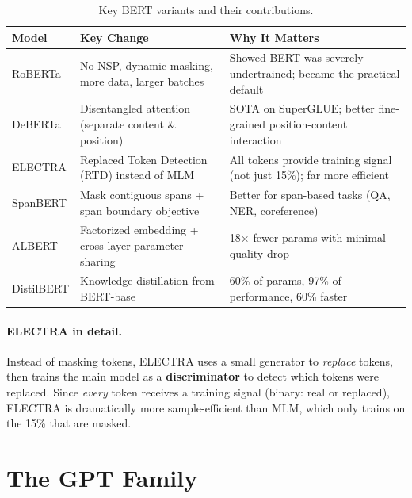 \begin{table}[H]
\centering
\small
\begin{tabularx}{\textwidth}{@{}l l X@{}}
\toprule
\textbf{Model} & \textbf{Key Change} & \textbf{Why It Matters} \\
\midrule
RoBERTa     & No NSP, dynamic masking, more data, larger batches
            & Showed BERT was severely undertrained; became the practical default \\
DeBERTa     & Disentangled attention (separate content \& position)
            & SOTA on SuperGLUE; better fine-grained position-content interaction \\
ELECTRA     & Replaced Token Detection (RTD) instead of MLM
            & All tokens provide training signal (not just 15\%); far more efficient \\
SpanBERT    & Mask contiguous spans + span boundary objective
            & Better for span-based tasks (QA, NER, coreference) \\
ALBERT      & Factorized embedding + cross-layer parameter sharing
            & 18$\times$ fewer params with minimal quality drop \\
DistilBERT  & Knowledge distillation from BERT-base
            & 60\% of params, 97\% of performance, 60\% faster \\
\bottomrule
\end{tabularx}
\caption{Key BERT variants and their contributions.}
\label{tab:bert-variants}
\end{table}

\paragraph{ELECTRA in detail.}  Instead of masking tokens, ELECTRA uses a
small generator to \emph{replace} tokens, then trains the main model as a
\textbf{discriminator} to detect which tokens were replaced.  Since \emph{every}
token receives a training signal (binary: real or replaced), ELECTRA is
dramatically more sample-efficient than MLM, which only trains on the 15\%
that are masked.


\section{The GPT Family}
\label{sec:gpt}

